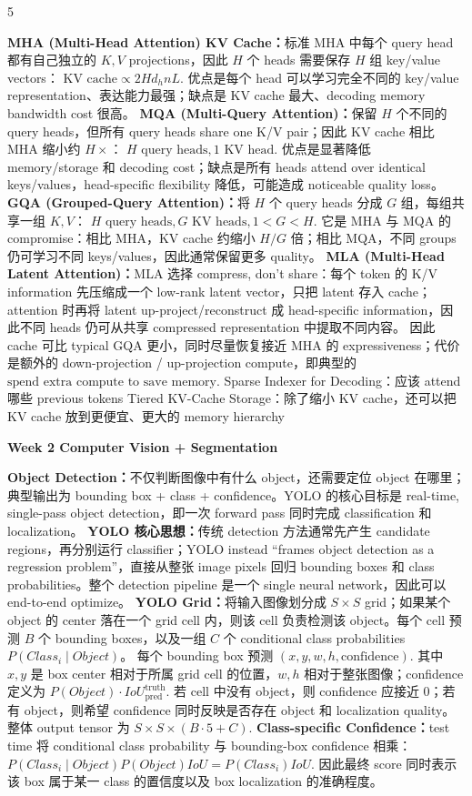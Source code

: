 \documentclass[a4paper, landscape]{article}
\newcommand{\topic}[1]{\par\medskip\textbf{#1}\par}
\renewcommand{\topic}[1]{%
  \par\smallskip\noindent
  \colorbox{highlightcolor}{%
    \parbox{\dimexpr\columnwidth-2\fboxsep\relax}{%
      \textbf{#1}%
    }%
  }%
  \par
}
\begin{document}
\begin{multicols}{5}
\par \textbf{MHA (Multi-Head Attention) KV Cache：}标准 MHA 中每个 query head 都有自己独立的 \(K,V\) projections，因此 \(H\) 个 heads 需要保存 \(H\) 组 key/value vectors：
\(
\text{KV cache}\propto 2H d_h nL.
\)
优点是每个 head 可以学习完全不同的 key/value representation、表达能力最强；缺点是 KV cache 最大、decoding memory bandwidth cost 很高。
\textbf{MQA (Multi-Query Attention)：}保留 \(H\) 个不同的 query heads，但所有 query heads share one K/V pair；因此 KV cache 相比 MHA 缩小约 \(H\times\)：
\(
H\text{ query heads}, 1\text{ KV head}.
\)
优点是显著降低 memory/storage 和 decoding cost；缺点是所有 heads attend over identical keys/values，head-specific flexibility 降低，可能造成 noticeable quality loss。
\textbf{GQA (Grouped-Query Attention)：}将 \(H\) 个 query heads 分成 \(G\) 组，每组共享一组 \(K,V\)：
\(
H\text{ query heads}, G\text{ KV heads}, 1<G<H.
\)
它是 MHA 与 MQA 的 compromise：相比 MHA，KV cache 约缩小 \(H/G\) 倍；相比 MQA，不同 groups 仍可学习不同 keys/values，因此通常保留更多 quality。
\textbf{MLA (Multi-Head Latent Attention)：}MLA 选择 compress, don't share：每个 token 的 K/V information 先压缩成一个 low-rank latent vector，只把 latent 存入 cache；attention 时再将 latent up-project/reconstruct 成 head-specific information，因此不同 heads 仍可从共享 compressed representation 中提取不同内容。
因此 cache 可比 typical GQA 更小，同时尽量恢复接近 MHA 的 expressiveness；代价是额外的 down-projection / up-projection compute，即典型的
\(
\text{spend extra compute to save memory}.
\)
Sparse Indexer for Decoding：应该 attend 哪些 previous tokens
Tiered KV-Cache Storage：除了缩小 KV cache，还可以把 KV cache 放到更便宜、更大的 memory hierarchy

\topic{Week 2 Computer Vision + Segmentation}
\par \textbf{Object Detection：}不仅判断图像中有什么 object，还需要定位 object 在哪里；典型输出为 bounding box + class + confidence。YOLO 的核心目标是 real-time, single-pass object detection，即一次 forward pass 同时完成 classification 和 localization。
\textbf{YOLO 核心思想：}传统 detection 方法通常先产生 candidate regions，再分别运行 classifier；YOLO instead ``frames object detection as a regression problem''，直接从整张 image pixels 回归 bounding boxes 和 class probabilities。整个 detection pipeline 是一个 single neural network，因此可以 end-to-end optimize。
\textbf{YOLO Grid：}将输入图像划分成 \(S\times S\) grid；如果某个 object 的 center 落在一个 grid cell 内，则该 cell 负责检测该 object。每个 cell 预测 \(B\) 个 bounding boxes，以及一组 \(C\) 个 conditional class probabilities \(P(Class_i\mid Object)\)。
每个 bounding box 预测
\(
(x,y,w,h,\mathrm{confidence}).
\)
其中 \(x,y\) 是 box center 相对于所属 grid cell 的位置，\(w,h\) 相对于整张图像；confidence 定义为
\(
P(Object)\cdot IoU_{\mathrm{pred}}^{\mathrm{truth}}.
\)
若 cell 中没有 object，则 confidence 应接近 0；若有 object，则希望 confidence 同时反映是否存在 object 和 localization quality。
整体 output tensor 为
\(
S\times S\times(B\cdot5+C).
\)
\textbf{Class-specific Confidence：}test time 将 conditional class probability 与 bounding-box confidence 相乘：
\(
P(Class_i\mid Object)P(Object)IoU
=
P(Class_i)IoU.
\)
因此最终 score 同时表示该 box 属于某一 class 的置信度以及 box localization 的准确程度。


\end{multicols}
\end{document}
